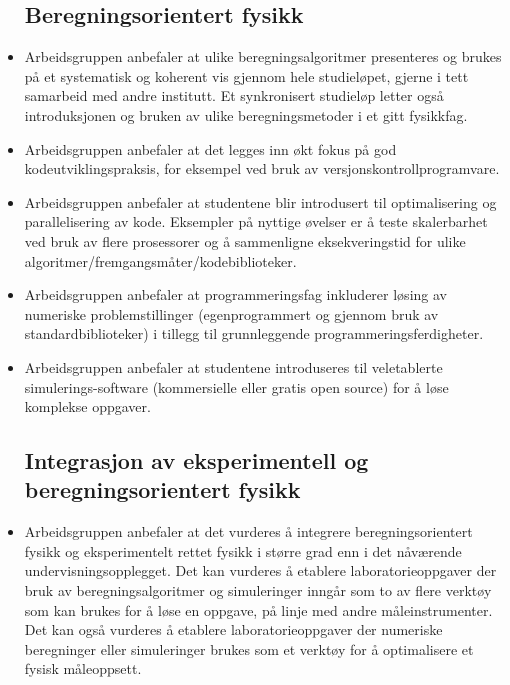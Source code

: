 \documentclass{article}
\begin{document}
\begin{itemize}
    \subsection {Beregningsorientert fysikk}
  \item Arbeidsgruppen anbefaler at ulike beregningsalgoritmer presenteres og brukes på et systematisk og koherent vis gjennom hele studieløpet, gjerne i tett samarbeid med andre institutt. Et synkronisert studieløp letter også introduksjonen og bruken av ulike beregningsmetoder i et gitt fysikkfag.
  \item Arbeidsgruppen anbefaler at det legges inn økt fokus på god kodeutviklingspraksis, for eksempel ved bruk av versjonskontrollprogramvare.
  \item Arbeidsgruppen anbefaler at studentene blir introdusert til optimalisering og parallelisering av kode. Eksempler på nyttige øvelser er å teste skalerbarhet ved bruk av flere prosessorer og å sammenligne eksekveringstid for ulike algoritmer/fremgangsmåter/kodebiblioteker.
  \item Arbeidsgruppen anbefaler at programmeringsfag inkluderer løsing av numeriske problemstillinger (egenprogrammert og gjennom bruk av standardbiblioteker) i tillegg til grunnleggende programmeringsferdigheter.
  \item Arbeidsgruppen anbefaler at studentene introduseres til veletablerte simulerings-software (kommersielle eller gratis open source) for å løse komplekse oppgaver.
\subsection{Integrasjon av eksperimentell og beregningsorientert fysikk}
   
  \item Arbeidsgruppen anbefaler at det vurderes å integrere beregningsorientert fysikk og eksperimentelt rettet fysikk i større grad enn i det nåværende undervisningsopplegget. Det kan vurderes å etablere laboratorieoppgaver der bruk av beregningsalgoritmer og simuleringer inngår som to av flere verktøy som kan brukes for å løse en oppgave, på linje med andre måleinstrumenter. Det kan også vurderes å etablere laboratorieoppgaver der numeriske beregninger eller simuleringer brukes som et verktøy for å optimalisere et fysisk måleoppsett.
  
\end{itemize}
\newpage
\appendix
\end{document}

